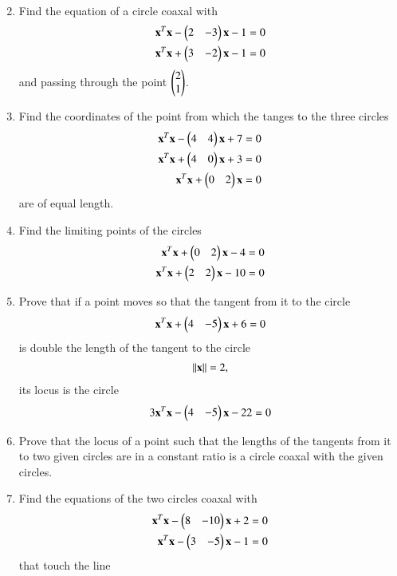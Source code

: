 \begin{enumerate}[label=\arabic*.,ref=\thesubsection.\theenumi]
\begin{enumerate}
\begin{align}
\end{align}
%
\end{enumerate}
\solution

\item Find the equation of a circle coaxal with
\begin{align}
\mathbf{x}^T\mathbf{x}-\begin{pmatrix}2 & -3\end{pmatrix}\mathbf{x}-1 &= 0
\\
\mathbf{x}^T\mathbf{x}+\begin{pmatrix}3 & -2\end{pmatrix}\mathbf{x}-1 &= 0
\end{align}
and passing through the point $\begin{pmatrix}2\\1\end{pmatrix}$.
\item Find the coordinates of the point from which the tanges to the three circles
\begin{align}
\mathbf{x}^T\mathbf{x}-\begin{pmatrix}4 & 4\end{pmatrix}\mathbf{x}+7 = 0
\\
\mathbf{x}^T\mathbf{x}+\begin{pmatrix}4 & 0\end{pmatrix}\mathbf{x}+3 = 0
\\
\mathbf{x}^T\mathbf{x}+\begin{pmatrix}0 & 2\end{pmatrix}\mathbf{x} = 0
\end{align}
are of equal length.
\item Find the limiting points of the circles
\begin{align}
\mathbf{x}^T\mathbf{x}+\begin{pmatrix}0 & 2\end{pmatrix}\mathbf{x}-4 &= 0
\\
\mathbf{x}^T\mathbf{x}+\begin{pmatrix}2 & 2\end{pmatrix}\mathbf{x}-10 &= 0
\end{align}
\item Prove that if a point moves so that the tangent from it to the circle
\begin{align}
\mathbf{x}^T\mathbf{x}+\begin{pmatrix}4 & -5\end{pmatrix}\mathbf{x}+6 = 0
\end{align}
is double the length of the tangent to the circle
\begin{align}
\left\lVert\mathbf{x}\right\rVert = 2,
\end{align}
its locus is the circle
\begin{align}
3\mathbf{x}^T\mathbf{x}-\begin{pmatrix}4 & -5\end{pmatrix}\mathbf{x}-22 = 0
\end{align}
\item Prove that the locus of a point such that the lengths of the tangents from it to two given circles are in a constant ratio is a circle
coaxal with the given circles.
\item Find the equations of the two circles coaxal with
\begin{align}
\mathbf{x}^T\mathbf{x}-\begin{pmatrix}8 & -10\end{pmatrix}\mathbf{x}+2 = 0
\\
\mathbf{x}^T\mathbf{x}-\begin{pmatrix}3 & -5\end{pmatrix}\mathbf{x}-1 = 0
\end{align}
that touch the line
\begin{align}

\end{align}
\end{enumerate}

